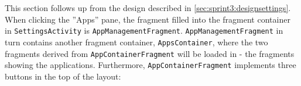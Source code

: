 This section follows up from the design described in \cref{sec:sprint3:designsettings}.
When clicking the ''Apps'' pane, the fragment filled into the fragment container in \lstinline!SettingsActivity! is \lstinline!AppManagementFragment!.
\lstinline!AppManagementFragment! in turn contains another fragment container, \lstinline!AppsContainer!, where the two fragments derived from \lstinline!AppContainerFragment! will be loaded in - the fragments showing the applications.
Furthermore, \lstinline!AppContainerFragment! implements three buttons in the top of the layout:


%

